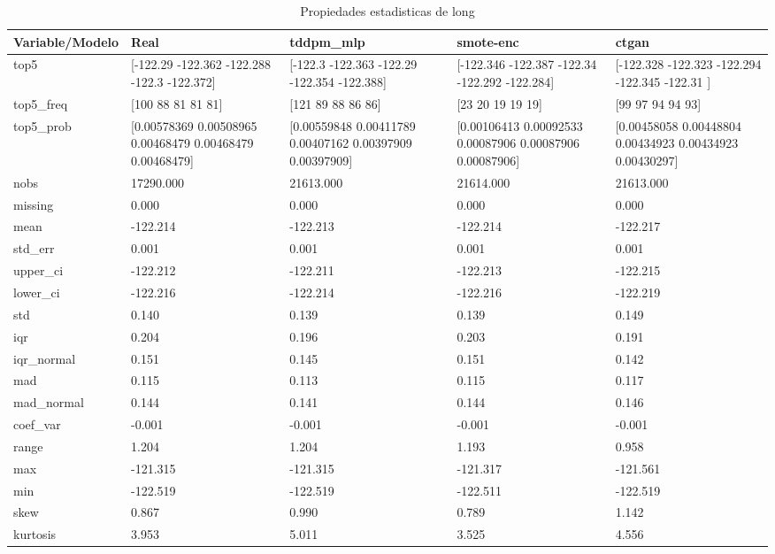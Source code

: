 \begin{table}[H]
\centering
\caption{Propiedades  estadisticas de long}
\label{table-stats-long}
\begin{tabular}{|l|m{10em}|m{10em}|m{10em}|m{10em}|}
\hline
 \rowcolor[gray]{0.8}
Variable/Modelo & Real & tddpm\_mlp & smote-enc & ctgan \\
\hline top5 & [-122.29  -122.362 -122.288 -122.3   -122.372] & [-122.3   -122.363 -122.29  -122.354 -122.388] & [-122.346 -122.387 -122.34  -122.292 -122.284] & [-122.328 -122.323 -122.294 -122.345 -122.31 ] \\
\hline top5\_freq & [100  88  81  81  81] & [121  89  88  86  86] & [23 20 19 19 19] & [99 97 94 94 93] \\
\hline top5\_prob & [0.00578369 0.00508965 0.00468479 0.00468479 0.00468479] & [0.00559848 0.00411789 0.00407162 0.00397909 0.00397909] & [0.00106413 0.00092533 0.00087906 0.00087906 0.00087906] & [0.00458058 0.00448804 0.00434923 0.00434923 0.00430297] \\
\hline nobs & 17290.000 & 21613.000 & 21614.000 & 21613.000 \\
\hline missing & 0.000 & 0.000 & 0.000 & 0.000 \\
\hline mean & -122.214 & -122.213 & -122.214 & -122.217 \\
\hline std\_err & 0.001 & 0.001 & 0.001 & 0.001 \\
\hline upper\_ci & -122.212 & -122.211 & -122.213 & -122.215 \\
\hline lower\_ci & -122.216 & -122.214 & -122.216 & -122.219 \\
\hline std & 0.140 & 0.139 & 0.139 & 0.149 \\
\hline iqr & 0.204 & 0.196 & 0.203 & 0.191 \\
\hline iqr\_normal & 0.151 & 0.145 & 0.151 & 0.142 \\
\hline mad & 0.115 & 0.113 & 0.115 & 0.117 \\
\hline mad\_normal & 0.144 & 0.141 & 0.144 & 0.146 \\
\hline coef\_var & -0.001 & -0.001 & -0.001 & -0.001 \\
\hline range & 1.204 & 1.204 & 1.193 & 0.958 \\
\hline max & -121.315 & -121.315 & -121.317 & -121.561 \\
\hline min & -122.519 & -122.519 & -122.511 & -122.519 \\
\hline skew & 0.867 & 0.990 & 0.789 & 1.142 \\
\hline kurtosis & 3.953 & 5.011 & 3.525 & 4.556 \\

\end{tabular}
\end{table}
